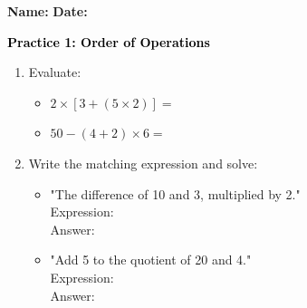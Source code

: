 \documentclass[12pt, letterpaper, fleqn]{article}
\newcommand{\blank}{\underline{\hspace{2.2cm}}}
\newcommand{\blanklong}{\underline{\hspace{6.5cm}}}
\begin{document}
\textbf{Name:} \underline{\hspace{5cm}}
\hfill
\textbf{Date:} \underline{\hspace{3cm}}\\

\begin{tcolorbox}[colback=customteal!20]
    \large\textcolor{black}{\textbf{Practice 1: Order of Operations}}
\end{tcolorbox}

\vspace{5mm}
\begin{enumerate}[itemsep=3cm, leftmargin=0.6cm]
\item Evaluate:
  \begin{itemize}[itemsep=1cm]
    \item $2 \times [3 + (5 \times 2)] = $ \blank
    \item $50 - (4 + 2) \times 6 = $ \blank
  \end{itemize}

\item Write the matching expression and solve:
  \begin{itemize}[itemsep=1.5cm]
    \item "The difference of 10 and 3, multiplied by 2." \\ Expression: \blanklong \\ Answer: \blank
    \item "Add 5 to the quotient of 20 and 4." \\ Expression: \blanklong \\ Answer: \blank
  \end{itemize}
\end{enumerate}
\end{document}
